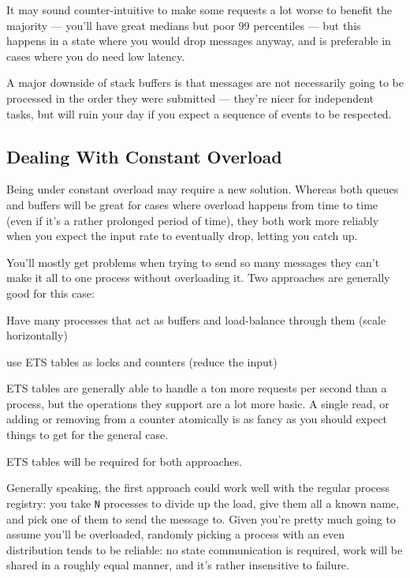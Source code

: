 \documentclass[11pt, oneside]{book}   	%
\newcommand{\var}[1]{\Verb`#1`}
\begin{document}
It may sound counter-intuitive to make some requests a lot worse to benefit the majority — you'll have great medians but poor 99 percentiles — but this happens in a state where you would drop messages anyway, and is preferable in cases where you do need low latency. 

A major downside of stack buffers is that messages are not necessarily going to be processed in the order they were submitted — they're nicer for independent tasks, but will ruin your day if you expect a sequence of events to be respected.

\subsection{Dealing With Constant Overload}

Being under constant overload may require a new solution. Whereas both queues and buffers will be great for cases where overload happens from time to time (even if it's a rather prolonged period of time), they both work more reliably when you expect the input rate to eventually drop, letting you catch up.

You'll mostly get problems when trying to send so many messages they can't make it all to one process without overloading it. Two approaches are generally good for this case:

\begin{itemize*}
	\item Have many processes that act as buffers and load-balance through them (scale horizontally)
	\item use ETS tables as locks and counters (reduce the input)
\end{itemize*}

ETS tables are generally able to handle a ton more requests per second than a process, but the operations they support are a lot more basic. A single read, or adding or removing from a counter atomically is as fancy as you should expect things to get for the general case.

ETS tables will be required for both approaches.

Generally speaking, the first approach could work well with the regular process registry: you take \var{N} processes to divide up the load, give them all a known name, and pick one of them to send the message to. Given you're pretty much going to assume you'll be overloaded, randomly picking a process with an even distribution tends to be reliable: no state communication is required, work will be shared in a roughly equal manner, and it's rather insensitive to failure.
\end{document}
